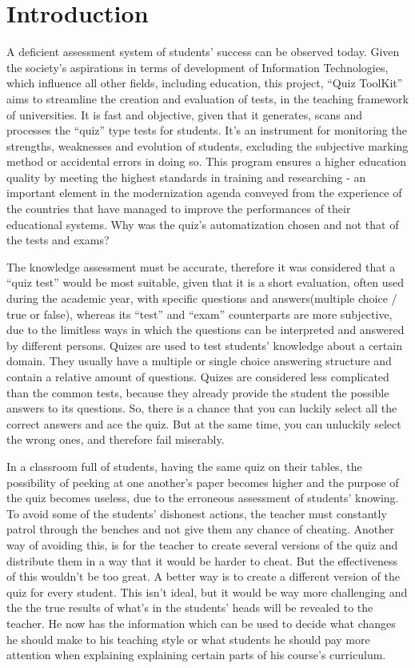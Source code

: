 \section*{Introduction}


A deficient assessment system of students’ success can be observed today. Given the society’s  aspirations in terms of development of Information Technologies, which influence all other fields, including education, this project, “Quiz ToolKit” aims to streamline the creation and evaluation of tests, in the teaching framework of universities. It is fast and objective, given that it generates, scans and processes the “quiz” type tests for students. It’s an instrument for monitoring the strengths, weaknesses and evolution of students, excluding the subjective marking method or accidental errors in doing so. This program ensures a higher education quality by meeting the highest standards in training and researching - an important element in the modernization agenda conveyed from the experience of the countries that have managed to improve the performances of their educational systems.
Why was the quiz’s automatization chosen and not that of the tests and exams?

The knowledge assessment must be accurate, therefore it was considered that a “quiz test” would be most suitable, given that it is a short evaluation, often used during the academic year, with specific questions and answers(multiple choice / true or false), whereas its “test” and “exam” counterparts are more subjective, due to the limitless ways in which the questions can be interpreted and answered by different persons.
Quizes are used to test students’ knowledge about a certain domain. They usually have a multiple or single choice answering structure and contain a relative amount of questions. Quizes are considered less complicated than the common tests, because they already provide the student the possible answers to its questions. So, there is a chance that you can luckily select all the correct answers and ace the quiz. But at the same time, you can unluckily select the wrong ones, and therefore fail miserably.

In a classroom full of students, having the same quiz on their tables, the possibility of peeking at one another’s paper becomes higher and the purpose of the quiz becomes useless, due to the erroneous assessment of students’ knowing. To avoid some of the students’ dishonest actions, the teacher must constantly patrol through the benches and not give them any chance of cheating. Another way of avoiding this, is for the teacher to create several versions of the quiz and distribute them in a way that it would be harder to cheat. But the effectiveness of this wouldn’t be too great. A better way is to create a different version of the quiz for every student. This isn’t ideal, but it would be way more challenging and the the true results of what’s in the students’ heads will be revealed to the teacher. He now has the information which can be used to decide what changes he should make to his teaching style or what students he should pay more attention when explaining  explaining certain parts of his course’s curriculum. 

